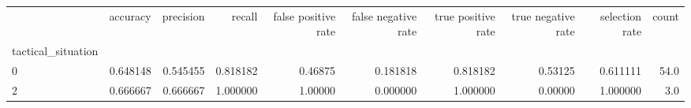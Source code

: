 \begin{tabular}{lrrrrrrrrr}
\toprule
{} &  accuracy &  precision &    recall &  false positive rate &  false negative rate &  true positive rate &  true negative rate &  selection rate &  count \\
tactical\_situation &           &            &           &                      &                      &                     &                     &                 &        \\
\midrule
0                  &  0.648148 &   0.545455 &  0.818182 &              0.46875 &             0.181818 &            0.818182 &             0.53125 &        0.611111 &   54.0 \\
2                  &  0.666667 &   0.666667 &  1.000000 &              1.00000 &             0.000000 &            1.000000 &             0.00000 &        1.000000 &    3.0 \\
\bottomrule
\end{tabular}

